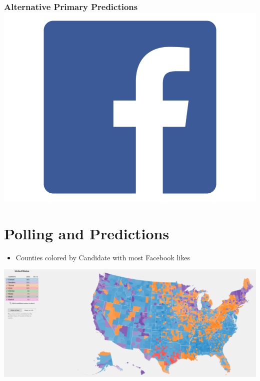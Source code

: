 \documentclass[xcolor=dvipsnames]{beamer}
\begin{document}
\begin{frame}
\frametitle{Alternative Primary Predictions \hfill \includegraphics[scale=.035]{images/facebook.png}}
\section{Polling and Predictions}
\begin{itemize}
\item Counties colored by Candidate with most Facebook likes 
\end{itemize}
\begin{center}

\includegraphics[scale=.14]{allmap.png}
\end{center}
\end{frame}
\end{document}
